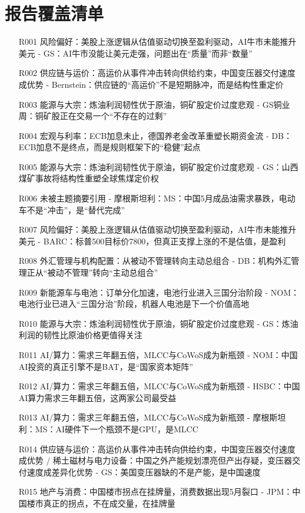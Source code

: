\documentclass[11pt]{ctexart}
\begin{document}
\section{报告覆盖清单}
\begin{itemize}
  \item [R001] 风险偏好：美股上涨逻辑从估值驱动切换至盈利驱动，AI牛市未能推升美元 - GS：AI牛市没能让美元走强，问题出在“质量”而非“数量”
  \item [R002] 供应链与运价：高运价从事件冲击转向供给约束，中国变压器交付速度成优势 - Bernstein：供应链的“高运价”不是短期脉冲，而是结构性重定价
  \item [R003] 能源与大宗：炼油利润韧性优于原油，铜矿股定价过度悲观 - GS铜业周：铜矿股正在交易一个“不存在的过剩”
  \item [R004] 宏观与利率：ECB加息未止，德国养老金改革重塑长期资金流 - DB：ECB加息不是终点，而是规则框架下的“稳健”起点
  \item [R005] 能源与大宗：炼油利润韧性优于原油，铜矿股定价过度悲观 - GS：山西煤矿事故将结构性重塑全球焦煤定价权
  \item [R006] 未被主题摘要引用 - 摩根斯坦利：MS：中国5月成品油需求暴跌，电动车不是“冲击”，是“替代完成”
  \item [R007] 风险偏好：美股上涨逻辑从估值驱动切换至盈利驱动，AI牛市未能推升美元 - BARC：标普500目标价7800，但真正支撑上涨的不是估值，是盈利
  \item [R008] 外汇管理与机构配置：从被动不管理转向主动总组合 - DB：机构外汇管理正从“被动不管理”转向“主动总组合”
  \item [R009] 新能源车与电池：订单分化加速，电池行业进入三国分治阶段 - NOM：电池行业已进入“三国分治”阶段，机器人电池是下一个价值高地
  \item [R010] 能源与大宗：炼油利润韧性优于原油，铜矿股定价过度悲观 - GS：炼油利润的韧性比原油价格更值得关注
  \item [R011] AI/算力：需求三年翻五倍，MLCC与CoWoS成为新瓶颈 - NOM：中国AI投资的真正引擎不是BAT，是“国家资本矩阵”
  \item [R012] AI/算力：需求三年翻五倍，MLCC与CoWoS成为新瓶颈 - HSBC：中国AI算力需求三年翻五倍，这两家公司最受益
  \item [R013] AI/算力：需求三年翻五倍，MLCC与CoWoS成为新瓶颈 - 摩根斯坦利：MS：AI硬件下一个瓶颈不是GPU，是MLCC
  \item [R014] 供应链与运价：高运价从事件冲击转向供给约束，中国变压器交付速度成优势 / 稀土磁材与电力设备：中国之外产能规划漂亮但产出存疑，变压器交付速度成差异化优势 - GS：美国变压器缺的不是产能，是中国速度
  \item [R015] 地产与消费：中国楼市拐点在挂牌量，消费数据出现5月裂口 - JPM：中国楼市真正的拐点，不在成交量，在挂牌量

\end{itemize}
\end{document}
